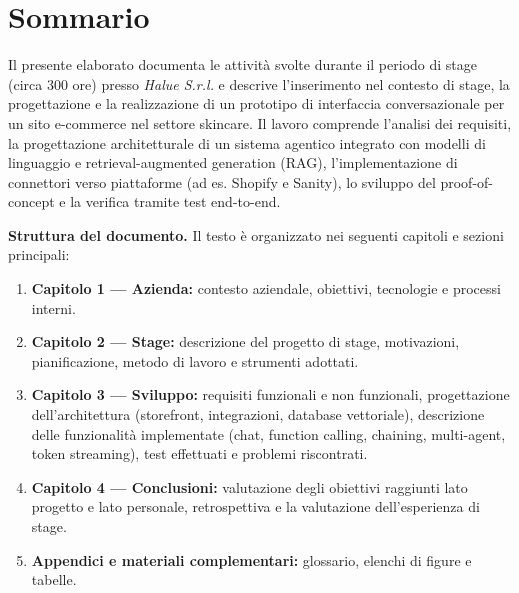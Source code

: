 \cleardoublepage
{}
{}
\begingroup
\let\clearpage\relax
\let\cleardoublepage\relax
\let\cleardoublepage\relax

\chapter*{Sommario}
Il presente elaborato documenta le attività svolte durante il periodo di stage (circa 300 ore) presso \textit{Halue S.r.l.} e descrive l'inserimento nel contesto di stage, la progettazione e la realizzazione di un prototipo di interfaccia conversazionale per un sito e-commerce nel settore skincare. Il lavoro comprende l'analisi dei requisiti, la progettazione architetturale di un sistema agentico integrato con modelli di linguaggio e retrieval-augmented generation (RAG), l'implementazione di connettori verso piattaforme (ad es. Shopify e Sanity), lo sviluppo del proof-of-concept e la verifica tramite test end-to-end.

\vspace{6pt}
\noindent\textbf{Struttura del documento.} Il testo è organizzato nei seguenti capitoli e sezioni principali:
\begin{enumerate}
  \item \textbf{Capitolo 1 — Azienda:} contesto aziendale, obiettivi, tecnologie e processi interni.
  \item \textbf{Capitolo 2 — Stage:} descrizione del progetto di stage, motivazioni, pianificazione, metodo di lavoro e strumenti adottati.
  \item \textbf{Capitolo 3 — Sviluppo:} requisiti funzionali e non funzionali, progettazione dell'architettura (storefront, integrazioni, database vettoriale), descrizione delle funzionalità implementate (chat, function calling, chaining, multi-agent, token streaming), test effettuati e problemi riscontrati.
  \item \textbf{Capitolo 4 — Conclusioni:} valutazione degli obiettivi raggiunti lato progetto e lato personale, retrospettiva e la valutazione dell'esperienza di stage.
  \item \textbf{Appendici e materiali complementari:} glossario, elenchi di figure e tabelle.
\end{enumerate}

